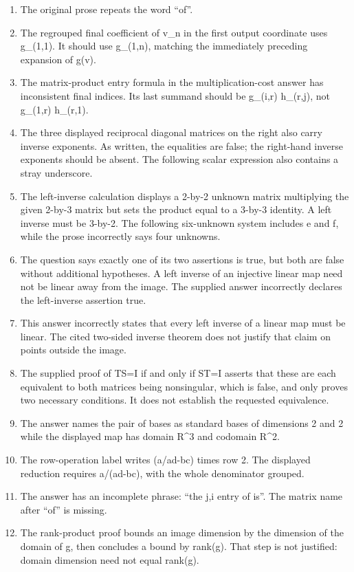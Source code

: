\begin{enumerate}
\item The original prose repeats the word “of”.
\item The regrouped final coefficient of v\_n in the first output coordinate uses g\_(1,1). It should use g\_(1,n), matching the immediately preceding expansion of g(v).
\item The matrix-product entry formula in the multiplication-cost answer has inconsistent final indices. Its last summand should be g\_(i,r) h\_(r,j), not g\_(1,r) h\_(r,1).
\item The three displayed reciprocal diagonal matrices on the right also carry inverse exponents. As written, the equalities are false; the right-hand inverse exponents should be absent. The following scalar expression also contains a stray underscore.
\item The left-inverse calculation displays a 2-by-2 unknown matrix multiplying the given 2-by-3 matrix but sets the product equal to a 3-by-3 identity. A left inverse must be 3-by-2. The following six-unknown system includes e and f, while the prose incorrectly says four unknowns.
\item The question says exactly one of its two assertions is true, but both are false without additional hypotheses. A left inverse of an injective linear map need not be linear away from the image. The supplied answer incorrectly declares the left-inverse assertion true.
\item This answer incorrectly states that every left inverse of a linear map must be linear. The cited two-sided inverse theorem does not justify that claim on points outside the image.
\item The supplied proof of TS=I if and only if ST=I asserts that these are each equivalent to both matrices being nonsingular, which is false, and only proves two necessary conditions. It does not establish the requested equivalence.
\item The answer names the pair of bases as standard bases of dimensions 2 and 2 while the displayed map has domain R\textasciicircum{}3 and codomain R\textasciicircum{}2.
\item The row-operation label writes (a/ad-bc) times row 2. The displayed reduction requires a/(ad-bc), with the whole denominator grouped.
\item The answer has an incomplete phrase: “the j,i entry of is”. The matrix name after “of” is missing.
\item The rank-product proof bounds an image dimension by the dimension of the domain of g, then concludes a bound by rank(g). That step is not justified: domain dimension need not equal rank(g).

\end{enumerate}
